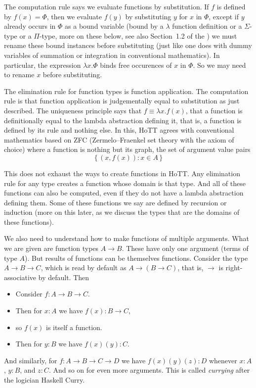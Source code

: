 \documentclass[11pt]{article}
\newcommand{\set}[1]{\{\,#1\,\}}
\begin{document}
The computation rule says we evaluate functions by substitution.
If $f$ is defined by $f(x) = \Phi$, then we evaluate $f(y)$ by substituting
$y$ for $x$ in $\Phi$, except if $y$ already occurs in $\Phi$ as a bound
variable (bound by a $\lambda$ function definition or a $\Sigma$-type
or a $\Pi$-type, more on these below,
see also Section~1.2 of the ) we must rename these
bound instances before substituting (just like one does with dummy variables
of summation or integration in conventional mathematics).
In particular, the expression $\lambda x . \Phi$ binds free occurences of $x$
in $\Phi$.  So we may need to rename $x$ before substituting.

The elimination rule for function types is function application.
The computation rule is that function application is judgementally equal
to substitution as just described.
The uniqueness principle says that $f \equiv \lambda x . f(x)$,
that a function is definitionally equal to the lambda abstraction defining
it, that is, a function is defined by its rule and nothing else.  In this,
HoTT agrees with conventional mathematics based on ZFC
(Zermelo–Fraenkel set theory with the axiom of choice) where a function is
nothing but its graph, the set of argument value pairs
$$
   \set{ (x, f(x)) : x \in A }
$$

This does not exhaust the ways to create functions in HoTT.  Any elimination
rule for any type creates a function whose domain is that type.  And all of
these functions can also be computed, even if they do not have a lambda
abstraction defining them.  Some of these functions we say are defined by
recursion or induction (more on this later, as we discuss the types that
are the domains of these functions).

We also need to understand how to make functions of multiple arguments.
What we are given are function types $A \to B$.  These have only one argument
(terms of type $A$).  But results of functions can be themselves functions.
Consider the type $A \to B \to C$, which is read by default as
$A \to (B \to C)$, that is, $\to$ is right-associative by default.
Then
\begin{itemize}
\item Consider $f : A \to B \to C$.
\item Then for $x : A$ we have $f(x) : B \to C$,
\item so $f(x)$ is itself a function.
\item Then for $y : B$ we have $f(x)(y) : C$.
\end{itemize}
And similarly, for $f : A \to B \to C \to D$ we have $f(x)(y)(z) : D$
whenever $x : A$, $y : B$, and $z : C$.  And so on for even more arguments.
This is called \emph{currying} after the logician Haskell Curry.
\end{document}
